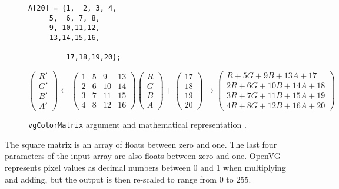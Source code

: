 \documentclass[12pt]{report}
\begin{document}
\begin{figure}[H]
\begin{mdframed}[style=default]
\begin{lstlisting}
A[20] = {1,  2, 3, 4,
	 5,  6, 7, 8,
	 9, 10,11,12,
	 13,14,15,16,

         17,18,19,20};
\end{lstlisting}

    \[
 \begin{pmatrix} R' \\ G' \\ B' \\ A' \end{pmatrix}
          \gets \begin{pmatrix} 1 & 5 & 9 &
 13 \\ 2 & 6 & 10 & 14 \\ 3 & 7 & 11 & 15 \\ 4 & 8 & 12 & 16 \end{pmatrix}
  \begin{pmatrix} R \\ G \\ B \\ A \end{pmatrix}
  + \begin{pmatrix} 17 \\ 18 \\ 19 \\ 20 \end{pmatrix} \to \begin{pmatrix} R + 5 G + 9 B + 13 A
  + 17 \\ 2 R + 6 G + 10 B + 14 A
            + 18 \\ 3 R + 7 G + 11 B + 15 A + 19 \\ 4 R + 8 G + 12 B + 16 A + 20 \end{pmatrix}
\]
\end{mdframed}
  \caption{{\tt vgColorMatrix} argument and mathematical representation \cite[p.~176]{openvg}.}
\end{figure}

The square matrix is an array of floats between zero and one. The
last four parameters of the input array are also floats between
zero and one. OpenVG represents pixel values as decimal numbers
between 0 and 1 when multiplying and adding, but the output is
then re-scaled to range from 0 to 255.
\end{document}
